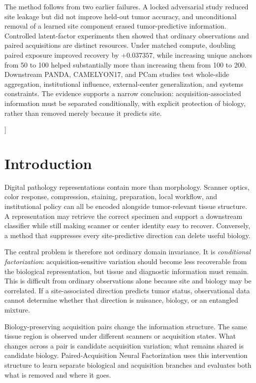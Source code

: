 \documentclass[10pt]{article}
\begin{document}
{\begin{center}
\begin{minipage}{0.90\textwidth}
The method follows from two earlier failures. A locked adversarial study reduced site leakage but did not improve held-out tumor accuracy, and unconditional removal of a learned site component erased tumor-predictive information. Controlled latent-factor experiments then showed that ordinary observations and paired acquisitions are distinct resources. Under matched compute, doubling paired exposure improved recovery by $+0.037357$, while increasing unique anchors from 50 to 100 helped substantially more than increasing them from 100 to 200. Downstream PANDA, CAMELYON17, and PCam studies test whole-slide aggregation, institutional influence, external-center generalization, and systems constraints. The evidence supports a narrow conclusion: acquisition-associated information must be separated conditionally, with explicit protection of biology, rather than removed merely because it predicts site.
\end{minipage}
\end{center}
\vspace{0.08in}
}]

\section{Introduction}
Digital pathology representations contain more than morphology. Scanner optics, color response, compression, staining, preparation, local workflow, and institutional policy can all be encoded alongside tumor-relevant tissue structure. A representation may retrieve the correct specimen and support a downstream classifier while still making scanner or center identity easy to recover. Conversely, a method that suppresses every site-predictive direction can delete useful biology.

The central problem is therefore not ordinary domain invariance. It is \emph{conditional factorization}: acquisition-sensitive variation should become less recoverable from the biological representation, but tissue and diagnostic information must remain. This is difficult from ordinary observations alone because site and biology may be correlated. If a site-associated direction predicts tumor status, observational data cannot determine whether that direction is nuisance, biology, or an entangled mixture.

Biology-preserving acquisition pairs change the information structure. The same tissue region is observed under different scanners or acquisition states. What changes across a pair is candidate acquisition variation; what remains shared is candidate biology. Paired-Acquisition Neural Factorization uses this intervention structure to learn separate biological and acquisition branches and evaluates both what is removed and where it goes.
\end{document}
